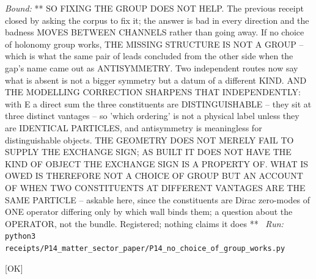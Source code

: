 \begin{description}
 \emph{Bound:} ** SO FIXING THE GROUP DOES NOT HELP. The previous receipt closed by asking the corpus to fix it; the answer is bad in every direction and the badness MOVES BETWEEN CHANNELS rather than going away. If no choice of holonomy group works, THE MISSING STRUCTURE IS NOT A GROUP -- which is what the same pair of leads concluded from the other side when the gap's name came out as ANTISYMMETRY. Two independent routes now say what is absent is not a bigger symmetry but a datum of a different KIND. AND THE MODELLING CORRECTION SHARPENS THAT INDEPENDENTLY: with E a direct sum the three constituents are DISTINGUISHABLE -- they sit at three distinct vantages -- so 'which ordering' is not a physical label unless they are IDENTICAL PARTICLES, and antisymmetry is meaningless for distinguishable objects. THE GEOMETRY DOES NOT MERELY FAIL TO SUPPLY THE EXCHANGE SIGN; AS BUILT IT DOES NOT HAVE THE KIND OF OBJECT THE EXCHANGE SIGN IS A PROPERTY OF. WHAT IS OWED IS THEREFORE NOT A CHOICE OF GROUP BUT AN ACCOUNT OF WHEN TWO CONSTITUENTS AT DIFFERENT VANTAGES ARE THE SAME PARTICLE -- askable here, since the constituents are Dirac zero-modes of ONE operator differing only by which wall binds them; a question about the OPERATOR, not the bundle. Registered; nothing claims it does **
\ \emph{Run:} \texttt{python3 receipts/P14\_matter\_sector\_paper/P14\_no\_choice\_of\_group\_works.py}
\item[\rcptlabel{P14_statistics_not_gauge}{P14R32}\textbf{P14R32}\quad\texttt{P14\_statistics\_not\_gauge}]\hfill\textsf{[OK]}\\

\end{description}
